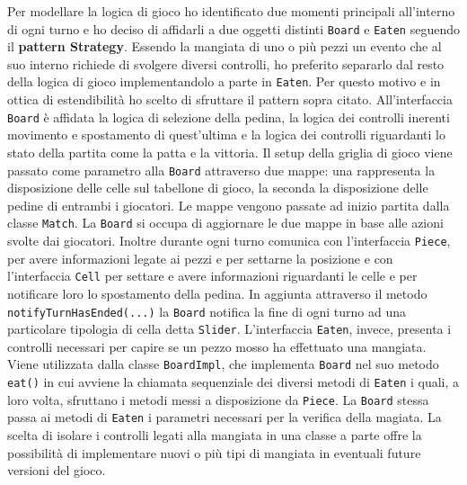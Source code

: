 \documentclass[a4paper,12pt]{report}
\begin{document}
Per modellare la logica di gioco ho identificato due momenti principali all’interno di ogni turno e ho deciso di affidarli a due oggetti distinti \texttt{Board}  e \texttt{Eaten} seguendo il \textbf{pattern Strategy}. Essendo la mangiata di uno o più pezzi un evento che al suo interno richiede di svolgere diversi controlli, ho preferito separarlo dal resto della logica di gioco implementandolo a parte in \texttt{Eaten}. Per questo motivo e in ottica di estendibilità ho scelto di sfruttare il pattern sopra citato.
All’interfaccia \texttt{Board} è affidata la logica di selezione della pedina, la logica dei controlli inerenti movimento e spostamento di quest’ultima e la logica dei controlli riguardanti lo stato della partita come la patta e la vittoria. Il setup della griglia di gioco viene passato come parametro alla \texttt{Board} attraverso due mappe: una rappresenta la disposizione delle celle sul tabellone di gioco, la seconda la disposizione delle pedine di entrambi i giocatori. Le mappe vengono passate ad inizio partita dalla classe \texttt{Match}.
La \texttt{Board} si occupa di aggiornare le due mappe in base alle azioni svolte dai giocatori. Inoltre durante ogni turno comunica con l'interfaccia \texttt{Piece}, per avere informazioni legate ai pezzi e per settarne la posizione e con l'interfaccia \texttt{Cell} per settare e avere informazioni riguardanti le celle e per notificare loro lo spostamento della pedina. In aggiunta attraverso il metodo \texttt{notifyTurnHasEnded(...)} la \texttt{Board} notifica la fine di ogni turno ad una particolare tipologia di cella detta \texttt{Slider}.
L'interfaccia \texttt{Eaten}, invece, presenta i controlli necessari per capire se un pezzo mosso ha effettuato una mangiata. Viene utilizzata dalla classe \texttt{BoardImpl}, che implementa \texttt{Board} nel suo metodo \texttt{eat()} in cui avviene la chiamata sequenziale dei diversi metodi di \texttt{Eaten}  i quali, a loro volta, sfruttano i metodi messi a disposizione da \texttt{Piece}. La \texttt{Board} stessa passa ai metodi di \texttt{Eaten} i parametri necessari per la verifica della magiata.
La scelta di isolare i controlli legati alla mangiata in una classe a parte offre la possibilità di implementare nuovi o più tipi di mangiata in eventuali future versioni del gioco.
\end{document}
